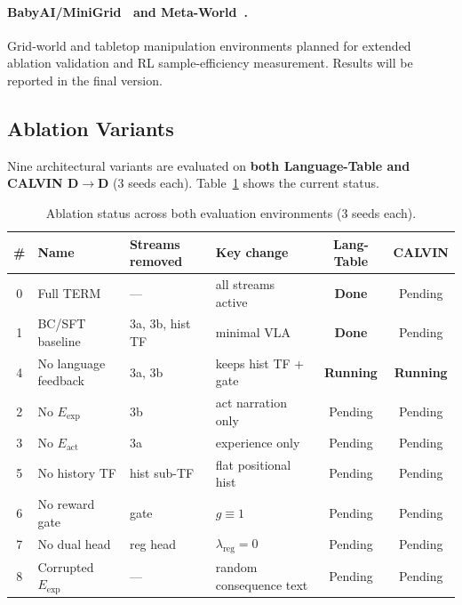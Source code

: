 \documentclass{article}
\renewcommand{\arraystretch}{1.25}
\newcommand{\modelname}{\textsc{TERM}\xspace}
\newcommand{\Lact}{$E_{\mathrm{act}}$\xspace}
\newcommand{\Lexp}{$E_{\mathrm{exp}}$\xspace}
\begin{document}
\paragraph{BabyAI/MiniGrid~\citep{chevalier2019babyai,minigrid} and
Meta-World~\citep{yu2020metaworld}.}
Grid-world and tabletop manipulation environments planned for extended
ablation validation and RL sample-efficiency measurement.
Results will be reported in the final version.

\subsection{Ablation Variants}
\label{sec:ablation_status}

Nine architectural variants are evaluated on \textbf{both Language-Table and
CALVIN D$\to$D} (3 seeds each).
Table~\ref{tab:ablation_status} shows the current status.

\begin{table}[h]
\centering
\caption{Ablation status across both evaluation environments (3 seeds each).}
\label{tab:ablation_status}
\small
\renewcommand{\arraystretch}{1.15}
\begin{tabular}{clllcc}
\toprule
\textbf{\#} & \textbf{Name} & \textbf{Streams removed} & \textbf{Key change}
            & \textbf{Lang-Table} & \textbf{CALVIN} \\
\midrule
0 & Full \modelname        & —                  & all streams active    & \textbf{Done} & Pending \\
1 & BC/SFT baseline        & 3a, 3b, hist TF    & minimal VLA           & \textbf{Done} & Pending \\
4 & No language feedback   & 3a, 3b             & keeps hist TF + gate  & \textbf{Running} & \textbf{Running} \\
2 & No \Lexp               & 3b                 & act narration only    & Pending & Pending \\
3 & No \Lact               & 3a                 & experience only       & Pending & Pending \\
5 & No history TF          & hist sub-TF        & flat positional hist  & Pending & Pending \\
6 & No reward gate         & gate               & $g\!\equiv\!1$        & Pending & Pending \\
7 & No dual head           & reg head           & $\lambda_\mathrm{reg}{=}0$ & Pending & Pending \\
8 & Corrupted \Lexp        & —                  & random consequence text & Pending & Pending \\
\bottomrule
\end{tabular}
\end{table}
\end{document}
